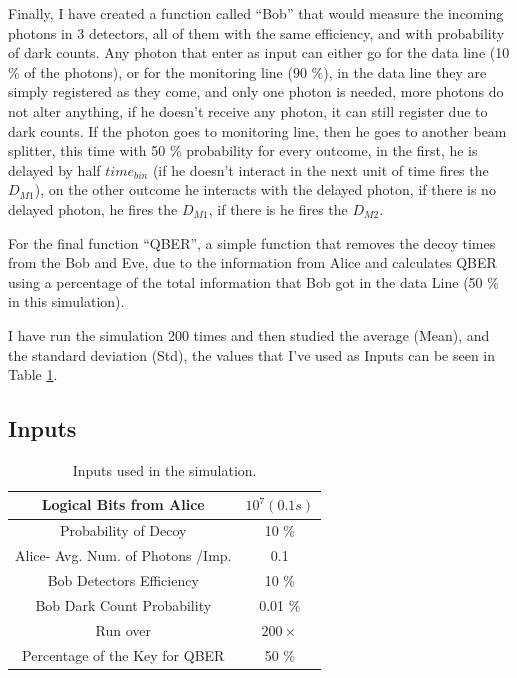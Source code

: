\begin{refsection}
Finally, I have created a function called ``Bob'' that would measure the incoming photons in 3 detectors, all of them with the same efficiency, and with probability of dark counts. Any photon that enter as input can either go for the data line (10 \% of the photons), or for the monitoring line (90 \%), in the data line they are simply registered as they come, and only one photon is needed, more photons do not alter anything, if he doesn't receive any photon, it can still register due to dark counts. If the photon goes to monitoring line, then he goes to another beam splitter, this time with 50 \% probability for every outcome, in the first, he is delayed by half $time_{bin}$ (if he doesn't interact in the next unit of time fires the $D_{M1}$), on the other outcome he interacts with the delayed photon, if there is no delayed photon, he fires the $D_{M1}$, if there is he fires the $D_{M2}$.

For the final function ``QBER'', a simple function that removes the decoy times from the Bob and Eve, due to the information from Alice and calculates QBER using a percentage of the total information that Bob got in the data Line (50 \% in this simulation).

I have run the simulation 200 times and then studied the average (Mean), and the standard deviation (Std), the values that I've used as Inputs can be seen in Table \ref{Inputs}.

\subsection*{Inputs}



\begin{table}[hbt!]
	\centering
	\begin{tabular}{|c|c|}
		\hline
		Logical Bits from Alice & $10^{7} (0.1 s)$ \\ \hline
		Probability of Decoy & 10 \% \\ \hline
		Alice- Avg. Num. of Photons /Imp. & 0.1\\ \hline
		Bob Detectors Efficiency & 10 \% \\ \hline
		Bob Dark Count Probability & 0.01 \% \\ \hline
		Run over & $200 \times$\\ \hline
		Percentage of the Key for QBER & 50 \% \\ \hline
	\end{tabular}
	\caption{Inputs used in the simulation.}
	\label{Inputs}
\end{table}


\end{refsection}
